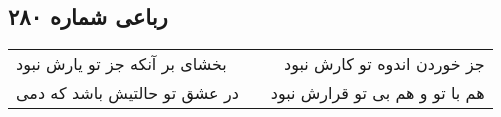 \begin{center}
\section*{رباعی شماره ۲۸۰}
\label{sec:sh280}
\begin{longtable}{l p{0.5cm} r}
بخشای بر آنکه جز تو یارش نبود
&&
جز خوردن اندوه تو کارش نبود
\\
در عشق تو حالتیش باشد که دمی
&&
هم با تو و هم بی تو قرارش نبود
\\
\end{longtable}
\end{center}
